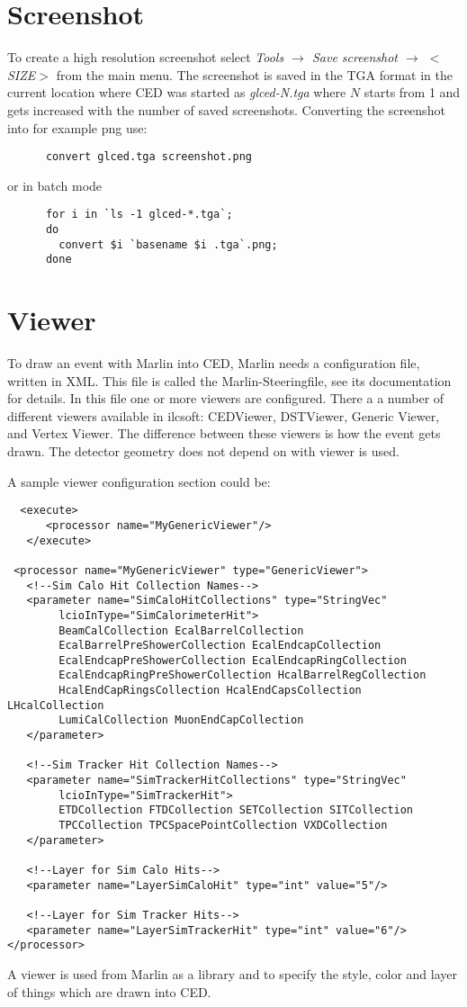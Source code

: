 \documentclass[a4paper,10pt]{article}
\begin{document}
\section{Screenshot}
To create a high resolution screenshot select \textit{Tools $\to$ Save screenshot $\to$ $<$SIZE$>$} from the main menu. 
The screenshot is saved in the TGA format in the current location where CED was started as \textit{glced-N.tga} where $N$ starts from 1 and gets increased
with the number of saved screenshots. Converting the screenshot into for example png use:
 \begin{verbatim}
      convert glced.tga screenshot.png
 \end{verbatim}
or in batch mode
\begin{verbatim}
      for i in `ls -1 glced-*.tga`;
      do
        convert $i `basename $i .tga`.png;
      done
 \end{verbatim}
 
\section{Viewer}
To draw an event with Marlin into CED, Marlin needs a configuration file, written in XML. This file is called the Marlin-Steeringfile, see its documentation for details. In this file one or more viewers are configured. There a a number of different viewers available in ilcsoft: CEDViewer, DSTViewer, Generic Viewer, and Vertex Viewer. The difference between these viewers is how the event gets drawn. The detector geometry does not depend on with viewer is used. 

A sample viewer configuration section could be:
 \begin{verbatim}
  <execute>
      <processor name="MyGenericViewer"/>
   </execute>

 <processor name="MyGenericViewer" type="GenericViewer">
   <!--Sim Calo Hit Collection Names-->
   <parameter name="SimCaloHitCollections" type="StringVec"
        lcioInType="SimCalorimeterHit"> 
        BeamCalCollection EcalBarrelCollection
        EcalBarrelPreShowerCollection EcalEndcapCollection 
        EcalEndcapPreShowerCollection EcalEndcapRingCollection 
        EcalEndcapRingPreShowerCollection HcalBarrelRegCollection 
        HcalEndCapRingsCollection HcalEndCapsCollection LHcalCollection 
        LumiCalCollection MuonEndCapCollection 
   </parameter>
   
   <!--Sim Tracker Hit Collection Names-->
   <parameter name="SimTrackerHitCollections" type="StringVec" 
        lcioInType="SimTrackerHit"> 
        ETDCollection FTDCollection SETCollection SITCollection 
        TPCCollection TPCSpacePointCollection VXDCollection 
   </parameter>

   <!--Layer for Sim Calo Hits-->
   <parameter name="LayerSimCaloHit" type="int" value="5"/>
   
   <!--Layer for Sim Tracker Hits-->
   <parameter name="LayerSimTrackerHit" type="int" value="6"/>
</processor>

 \end{verbatim}
A viewer is used from Marlin as a library and to specify the style, color and layer of things which are drawn into CED.
\end{document}
